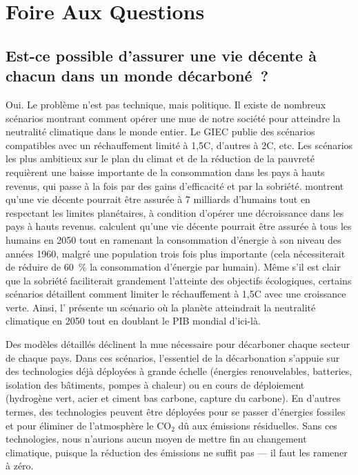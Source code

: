 \documentclass[a5paper,french]{memoir}
\begin{document}
\chapter*{Foire Aux Questions}\label{ch:faq}

\section*{\normalsize Est-ce possible d'assurer une vie décente à chacun dans un monde décarboné~?}\label{q:decent}

Oui. Le problème n'est pas technique, mais politique. Il existe de nombreux scénarios montrant comment opérer une mue de notre société pour atteindre la neutralité climatique dans le monde entier. Le GIEC publie des scénarios compatibles avec un réchauffement limité à 1,5\textdegree{}C, d'autres à 2\textdegree{}C, etc. Les scénarios les plus ambitieux sur le plan du climat et de la réduction de la pauvreté requièrent une baisse importante de la consommation dans les pays à hauts revenus, qui passe à la fois par des gains d'efficacité et par la sobriété. \cite{oneill_good_2018,hickel_is_2019} montrent qu'une vie décente pourrait être assurée à 7 milliards d'humains tout en respectant les limites planétaires, à condition d'opérer une décroissance dans les pays à hauts revenus. \cite{millward-hopkins_providing_2020} calculent qu'une vie décente pourrait être assurée à tous les humains en 2050 tout en ramenant la consommation d'énergie à son niveau des années 1960, malgré une population trois fois plus importante (cela nécessiterait de réduire de 60~\% la consommation d'énergie par humain). Même s'il est clair que la sobriété faciliterait grandement l'atteinte des objectifs écologiques, certains scénarios détaillent comment limiter le réchauffement à 1,5\textdegree{}C avec une croissance verte. Ainsi, l'\cite{iea_net_2023} présente un scénario où la planète atteindrait la neutralité climatique en 2050 tout en doublant le PIB mondial d'ici-là. 

Des modèles détaillés déclinent la mue nécessaire pour décarboner chaque secteur de chaque pays. Dans ces scénarios, l'essentiel de la décarbonation s'appuie sur des technologies déjà déployées à grande échelle (énergies renouvelables, batteries, isolation des bâtiments, pompes à chaleur) ou en cours de déploiement (hydrogène vert, acier et ciment bas carbone, capture du carbone). En d'autres termes, des technologies peuvent être déployées pour se passer d'énergies fossiles et pour éliminer de l'atmosphère le CO$_\text{2}$ dû aux émissions résiduelles. Sans ces technologies, nous n'aurions aucun moyen de mettre fin au changement climatique, puisque la réduction des émissions ne suffit pas --- il faut les ramener à zéro. 
\end{document}
